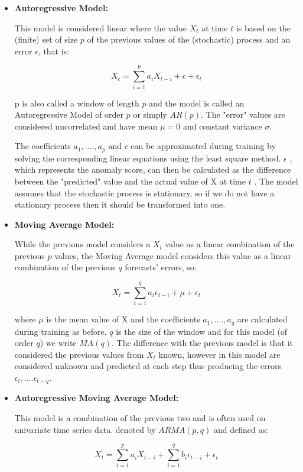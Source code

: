 \documentclass[a4paper,12pt]{report}
\theoremstyle{definitionNODot}
\begin{document}
	\begin{itemize}
		\item \textbf{Autoregressive Model:}
		
		This model is considered linear where the value $X_t$ at time $t$ is based on the (finite) set of size $p$ of the previous values of the (stochastic) process and an error $\epsilon$, that is:
		
		$$X_t = \sum_{i=1}^{p}a_i X_{t-i} + c + \epsilon_t$$
		
		p is also called a window of length $p$ and the model is called an Autoregressive Model of order $p$ or simply $AR(p)$. The "error" values are considered uncorrelated and have mean $\mu=0$ and constant variance $\sigma$.
		
		The coefficients $a_1,....,a_p$ and $c$ can be approximated during training by solving the corresponding linear equations using the least square method. $\epsilon$ , which represents the anomaly score, can then be calculated as the difference between the "predicted" value and the actual value of X at time $t$ . The model assumes that the stochastic process is stationary, so if we do not have a stationary process then it should be transformed into one.
		
		\item \textbf{Moving Average Model:}
		
		While the previous model considers a $X_t$ value as a linear combination of the previous $p$ values, the Moving Average model considers this value as a linear combination of the previous $q$ forecasts' errors, so:
		
		$$X_t = \sum_{i=1}^{q}a_i \epsilon_{t-i} + \mu + \epsilon_t$$
		
		where $\mu$ is the mean value of X and the coefficients $a_1,....,a_q$ are calculated during training as before. $q$ is the size of the window and for this model (of order $q$) we write $MA(q)$. The difference with the previous model is that it considered the previous values from $X_t$ known, however in this model are considered unknown and predicted at each step thus producing the errors {$\epsilon_t,....\epsilon_{t-q}$}. 
		
		\item \textbf{Autoregressive Moving Average Model:}
		
		This model is a combination of the previous two and is often used on univariate time series data. denoted by $ARMA(p,q)$ and defined as:
		
		$$X_t = \sum_{i=1}^{p}a_i X_{t-i} + \sum_{i=1}^{q}b_i \epsilon_{t-i} + \epsilon_t$$
		

\end{itemize}
\end{document}
